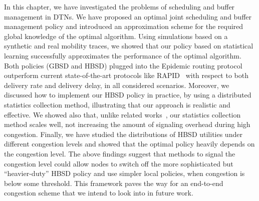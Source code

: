 In this chapter, we have investigated the problems of scheduling and buffer management in DTNs. We have proposed an optimal joint scheduling and buffer management policy and introduced an approximation scheme for the required global knowledge of the optimal algorithm. Using simulations based on a synthetic and real mobility traces, we showed that our policy based on statistical learning successfully approximates the performance of the optimal algorithm. Both policies (GBSD and HBSD) plugged into the Epidemic routing protocol
outperform current state-of-the-art protocols like RAPID~\cite{Levine:Sigcomm07} with respect to both delivery rate and delivery delay, in all considered scenarios. Moreover, we discussed how to implement our HBSD policy in practice, by using a distributed statistics collection method, illustrating that our approach is realistic and effective. We showed also that, unlike related works~\cite{Levine:Sigcomm07, AOBM}, our statistics collection method scales well, not increasing the amount of signaling overhead during high congestion. Finally, we have studied the distributions of HBSD utilities under different congestion levels and showed that the optimal policy heavily depends on the congestion level. The above findings suggest that methods to signal the congestion level could allow nodes to switch off the more sophisticated but ``heavier-duty'' HBSD policy and use simpler local policies, when congestion is below some threshold. This framework paves the way for an end-to-end congestion scheme that we intend to look into in future work.

